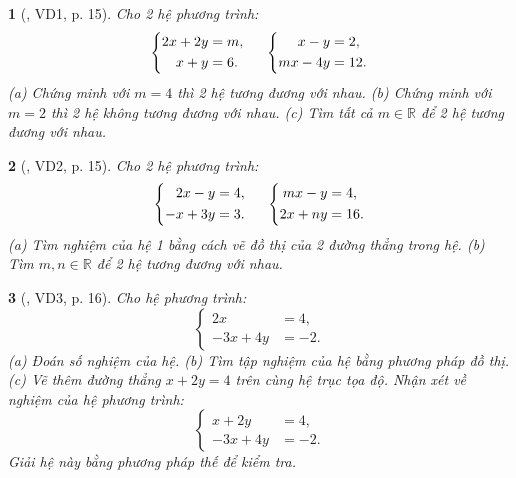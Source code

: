 \documentclass{article}
\newtheorem{baitoan}{}
\begin{document}
\begin{baitoan}[\cite{Binh_boi_duong_Toan_9_tap_2}, VD1, p. 15]
	Cho 2 hệ phương trình:
	\begin{equation*}
		\left\{\begin{split}
			2x + 2y &= m,\\
			x + y &= 6.
		\end{split}\right.\hspace{5mm}
		\left\{\begin{split}
			x - y &= 2,\\
			mx - 4y &= 12.
		\end{split}\right.
	\end{equation*}
	(a) Chứng minh với $m = 4$ thì 2 hệ tương đương với nhau. (b) Chứng minh với $m = 2$ thì 2 hệ không tương đương với nhau. (c) Tìm tất cả $m\in\mathbb{R}$ để 2 hệ tương đương với nhau.
\end{baitoan}

\begin{baitoan}[\cite{Binh_boi_duong_Toan_9_tap_2}, VD2, p. 15]
	Cho 2 hệ phương trình:
	\begin{equation*}
		\left\{\begin{split}
			2x - y &= 4,\\
			-x + 3y &= 3.
		\end{split}\right.\hspace{5mm}
		\left\{\begin{split}
			mx - y &= 4,\\
			2x + ny &= 16.
		\end{split}\right.
	\end{equation*}
	(a) Tìm nghiệm của hệ 1 bằng cách vẽ đồ thị của 2 đường thẳng trong hệ. (b) Tìm $m,n\in\mathbb{R}$ để 2 hệ tương đương với nhau.
\end{baitoan}

\begin{baitoan}[\cite{Binh_boi_duong_Toan_9_tap_2}, VD3, p. 16]
	Cho hệ phương trình:
	\begin{equation*}
		\left\{\begin{split}
			2x &= 4,\\
			-3x + 4y &= -2.
		\end{split}\right.
	\end{equation*}
	(a) Đoán số nghiệm của hệ. (b) Tìm tập nghiệm của hệ bằng phương pháp đồ thị. (c) Vẽ thêm đường thẳng $x + 2y = 4$ trên cùng hệ trục tọa độ. Nhận xét về nghiệm của hệ phương trình:
	\begin{equation*}
		\left\{\begin{split}
			x + 2y &= 4,\\
			-3x + 4y &= -2.
		\end{split}\right.
	\end{equation*}
	Giải hệ này bằng phương pháp thế để kiểm tra.
\end{baitoan}
\end{document}
